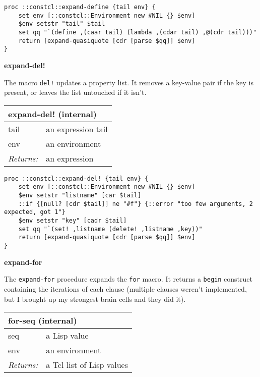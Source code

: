 \documentclass{report}
\begin{document}
\noindent\makebox[\linewidth]{\rule{\linewidth}{0.4pt}}
\begin{lstlisting}
proc ::constcl::expand-define {tail env} {
    set env [::constcl::Environment new #NIL {} $env]
    $env setstr "tail" $tail
    set qq "`(define ,(caar tail) (lambda ,(cdar tail) ,@(cdr tail)))"
    return [expand-quasiquote [cdr [parse $qq]] $env]
}
\end{lstlisting}
\noindent\makebox[\linewidth]{\rule{\linewidth}{0.4pt}}

\textbf{expand-del!}


The macro \texttt{del!} updates a property list. It removes a key-value pair if the key is present, or leaves the list untouched if it isn't.

\begin{tabular}{ |l l| }
\hline
\multicolumn{2}{|l|}{expand-del! (internal)} \\
\hline
tail & an expression tail \\
env & an environment \\
\textit{Returns:} & an expression \\
\hline
\end{tabular}

\noindent\makebox[\linewidth]{\rule{\linewidth}{0.4pt}}
\begin{lstlisting}
proc ::constcl::expand-del! {tail env} {
    set env [::constcl::Environment new #NIL {} $env]
    $env setstr "listname" [car $tail]
    ::if {[null? [cdr $tail]] ne "#f"} {::error "too few arguments, 2 expected, got 1"}
    $env setstr "key" [cadr $tail]
    set qq "`(set! ,listname (delete! ,listname ,key))"
    return [expand-quasiquote [cdr [parse $qq]] $env]
}
\end{lstlisting}
\noindent\makebox[\linewidth]{\rule{\linewidth}{0.4pt}}

\textbf{expand-for}


The \texttt{expand-for} procedure expands the \texttt{for} macro. It returns a \texttt{begin} construct containing the iterations of each clause (multiple clauses weren't implemented, but I brought up my strongest brain cells and they did it).

\begin{tabular}{ |l l| }
\hline
\multicolumn{2}{|l|}{for-seq (internal)} \\
\hline
seq & a Lisp value \\
env & an environment \\
\textit{Returns:} & a Tcl list of Lisp values \\
\hline
\end{tabular}
\end{document}
